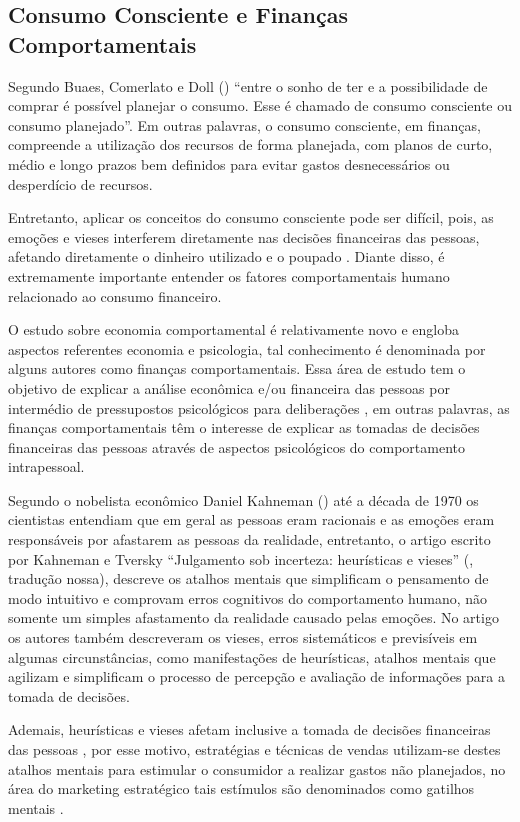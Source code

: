 \subsection{Consumo Consciente e Finanças Comportamentais}
Segundo Buaes, Comerlato e Doll (\citeyear{buaes2015}) “entre o sonho de ter e a possibilidade de comprar é possível planejar o consumo. Esse é chamado de consumo consciente ou consumo planejado”. Em outras palavras, o consumo consciente, em finanças, compreende a utilização dos recursos de forma planejada, com planos de curto, médio e longo prazos bem definidos para evitar gastos desnecessários ou desperdício de recursos.

Entretanto, aplicar os conceitos do consumo consciente pode ser difícil, pois, as emoções e vieses interferem diretamente nas decisões financeiras das pessoas, afetando diretamente o dinheiro utilizado e o poupado \cite{martins2004}. Diante disso, é extremamente importante entender os fatores comportamentais humano relacionado ao consumo financeiro.

O estudo sobre economia comportamental é relativamente novo e engloba aspectos referentes economia e psicologia, tal conhecimento é denominada por alguns autores como finanças comportamentais. Essa área de estudo tem o objetivo de explicar a análise econômica e/ou financeira das pessoas por intermédio de pressupostos psicológicos para deliberações \cite{castro2014}, em outras palavras, as finanças comportamentais têm o interesse de explicar as tomadas de decisões financeiras das pessoas através de aspectos psicológicos do comportamento intrapessoal.

Segundo o nobelista econômico Daniel Kahneman (\citeyear{kahneman2012}) até a década de 1970 os cientistas entendiam que em geral as pessoas eram racionais e as emoções eram responsáveis por afastarem as pessoas da realidade, entretanto, o artigo escrito por Kahneman e Tversky “Julgamento sob incerteza: heurísticas e vieses” (\citeyear{kahneman1974}, tradução nossa), descreve os atalhos mentais que simplificam o pensamento de modo intuitivo e comprovam erros cognitivos do comportamento humano, não somente um simples afastamento da realidade causado pelas emoções. No artigo os autores também descreveram os vieses, erros sistemáticos e previsíveis em algumas circunstâncias, como manifestações de heurísticas, atalhos mentais que agilizam e simplificam o processo de percepção e avaliação de informações para a tomada de decisões.

Ademais, heurísticas e vieses afetam inclusive a tomada de decisões financeiras das pessoas \cite{kahneman2012}, por esse motivo, estratégias e técnicas de vendas utilizam-se destes atalhos mentais para estimular o consumidor a realizar gastos não planejados, no área do marketing estratégico tais estímulos são denominados como gatilhos mentais \cite{cialdini2012}.

